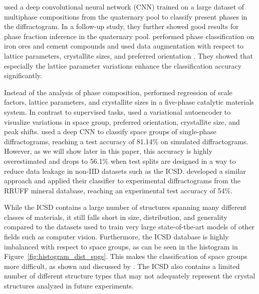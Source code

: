 \citeauthor{leeDeeplearningTechniquePhase2020} used a deep convolutional neural
network (CNN) trained on a large dataset of multiphase compositions from the
quaternary  pool to classify present phases in the
diffractogram\supercite{leeDeeplearningTechniquePhase2020}. In a follow-up
study, they further showed good results for phase fraction inference in the
quaternary  pool\supercite{leeDatadrivenXRDAnalysis2021}.
\citeauthor{schuetzkeEnhancingDeeplearningTraining2021} performed phase
classification on iron ores and cement compounds and used data augmentation with
respect to lattice parameters, crystallite sizes, and preferred orientation
\supercite{schuetzkeEnhancingDeeplearningTraining2021}. They showed that
especially the lattice parameter variations enhance the classification accuracy
significantly.

Instead of the analysis of phase composition,
\citeauthor{dongDeepConvolutionalNeural2021} performed regression of scale
factors, lattice parameters, and crystallite sizes in a five-phase catalytic
materials system\supercite{dongDeepConvolutionalNeural2021}. In contrast to
supervised tasks, \citeauthor{bankoDeepLearningVisualization2021} used a
variational autoencoder to visualize variations in space group, preferred
orientation, crystallite size, and peak
shifts\supercite{bankoDeepLearningVisualization2021}.
\citeauthor{parkClassificationCrystalStructure2017} used a deep CNN to classify
space groups of single-phase diffractograms, reaching a test accuracy of 81.14\%
on simulated diffractograms.\supercite{parkClassificationCrystalStructure2017} 
However, as we will show later in this paper, this accuracy is highly overestimated and drops to 56.1\% when test splits are designed in a way to reduce data leakage in non-IID datasets such as the ICSD.
\citeauthor{vecseiNeuralNetworkBased2019}\supercite{vecseiNeuralNetworkBased2019} developed
a similar approach and applied their classifier to experimental diffractograms
from the RRUFF mineral database\supercite{lafuentePowerDatabasesRRUFF2015},
reaching an experimental test accuracy of 54\%.

While the ICSD contains a large number of structures spanning many different
classes of materials, it still falls short in size, distribution, and generality
compared to the datasets used to train very large state-of-the-art models of
other fields such as computer vision.
Furthermore, the ICSD
database is highly imbalanced with respect to space groups, as can be seen
in the histogram in Figure~\ref{fig:histogram_dist_spgs}. This makes the classification of
space groups more difficult, as shown and discussed by
\citeauthor{zalogaCrystalSymmetryClassification2020}
\supercite{zalogaCrystalSymmetryClassification2020}. The ICSD also contains a
limited number of different structure types that may not adequately represent
the crystal structures analyzed in future experiments.


